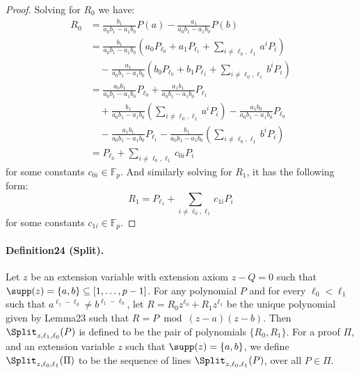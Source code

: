 \begin{proof}
Solving for $R_0$ we have:
\begin{align*}
R_0&=\frac{b_1}{a_0b_1-a_1b_0}P(a)-\frac{a_1}{a_0b_1-a_1b_0}P(b)\\
&=\frac{b_1}{a_0b_1-a_1b_0}\left(a_0P_{\ell_0}+a_1P_{\ell_1}+\sum_{i\neq\ell_0,\ell_1}a^iP_i\right)\\
&\quad-\frac{a_1}{a_0b_1-a_1b_0}\left(b_0P_{\ell_0}+b_1P_{\ell_1}+\sum_{i\neq\ell_0,\ell_1}b^iP_i\right)\\
&=\frac{a_0b_1}{a_0b_1-a_1b_0}P_{\ell_0}+\frac{a_1b_1}{a_0b_1-a_1b_0}P_{\ell_1}\\
&\quad+\frac{b_1}{a_0b_1-a_1b_0}\left(\sum_{i\neq\ell_0,\ell_1}a^iP_i\right)-\frac{a_1b_0}{a_0b_1-a_1b_0}P_{\ell_0}\\
&\quad-\frac{a_1b_1}{a_0b_1-a_1b_0}P_{\ell_1}-\frac{b_1}{a_0b_1-a_1b_0}\left(\sum_{i\neq\ell_0,\ell_1}b^iP_i\right)\\
&=P_{\ell_0}+\sum_{i\neq\ell_0,\ell_1}c_{0i}P_i
\end{align*}
for some constants $c_{0i}\in\mathbb F_p$. And similarly solving for $R_1$, it has the following form:
\[R_1=P_{\ell_1}+\sum_{i\neq\ell_0,\ell_1}c_{1i}P_i\]
for some constants $c_{1i}\in\mathbb F_p$.
\end{proof}
\paragraph{Definition24 (Split).} Let $z$ be an extension variable with extension axiom $z-Q=0$ such that $\supp(z)=\{a,b\}\subseteq[1,\ldots,p-1]$. For any polynomial $P$ and for every $\ell_0<\ell_1$ such that $a^{\ell_1-\ell_0}\neq b^{\ell_1-\ell_0}$, let $R=R_0z^{\ell_0}+R_1z^{\ell_1}$ be the unique polynomial given by Lemma23 such that $R=P\bmod(z-a)(z-b)$. Then $\Split_{z,\ell_1,\ell_0}(P)$ is defined to be the pair of polynomials $\{R_0,R_1\}$. For a proof $\Pi$, and an extension variable $z$ such that $\supp(z)=\{a,b\}$, we define $\Split_{z,\ell_0,\ell_1}(\Pi)$ to be the sequence of lines $\Split_{z,\ell_0,\ell_1}(P)$, over all $P\in\Pi$.
